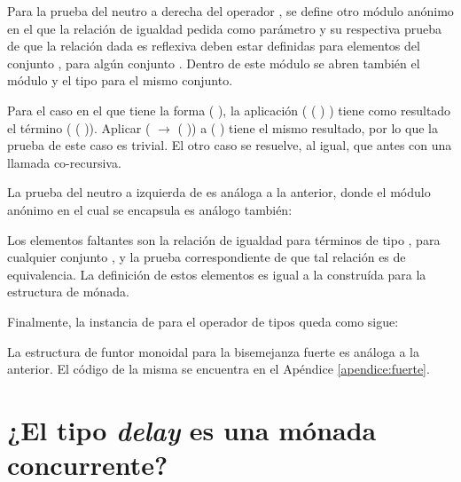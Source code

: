 \begin{AgdaAlign}
Para la prueba del neutro a derecha del operador , se define otro módulo anónimo en el que la relación de igualdad pedida como parámetro y su respectiva prueba de que la relación dada es reflexiva deben estar definidas para elementos del conjunto  \AgdaDatatype{$\times$ $\top$}, para algún conjunto . Dentro de este módulo se abren también el módulo  y el tipo  para el mismo conjunto.


Para el caso en el que  tiene la forma ( ), la aplicación ( ( ) ) tiene como resultado el término ( ( )). Aplicar  (  $\rightarrow$ ( )) a ( ) tiene el mismo resultado, por lo que la prueba de este caso es trivial. El otro caso se resuelve, al igual, que antes con una llamada co-recursiva. 

La prueba del neutro a izquierda de  es análoga a la anterior, donde el módulo anónimo en el cual se encapsula es análogo también:


Los elementos faltantes son la relación de igualdad para términos de tipo  \AgdaDatatype{$\bot$}, para cualquier conjunto , y la prueba correspondiente de que tal relación es de equivalencia. La definición de estos elementos es igual a la construída para la estructura de mónada.


Finalmente, la instancia de  para el operador de tipos \AgdaDatatype{$\_\bot$} queda como sigue:

\end{AgdaAlign} 

La estructura de funtor monoidal para la bisemejanza fuerte es análoga a la anterior. El código de la misma se encuentra en el Apéndice \ref{apendice:fuerte}. 

\section{¿El tipo \textit{delay} es una mónada concurrente?}\label{casodelay:concmonad}

